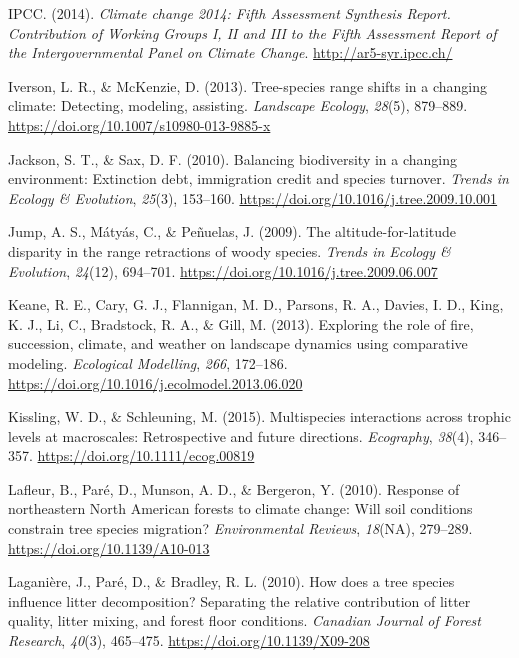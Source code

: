 \documentclass[
]{article}
\begin{document}
\leavevmode\hypertarget{ref-ipcc_climate_2014}{}%
IPCC. (2014). \emph{Climate change 2014: Fifth Assessment Synthesis
Report. Contribution of Working Groups I, II and III to the Fifth
Assessment Report of the Intergovernmental Panel on Climate Change}.
\url{http://ar5-syr.ipcc.ch/}

\leavevmode\hypertarget{ref-iverson_tree-species_2013}{}%
Iverson, L. R., \& McKenzie, D. (2013). Tree-species range shifts in a
changing climate: Detecting, modeling, assisting. \emph{Landscape
Ecology}, \emph{28}(5), 879--889.
\url{https://doi.org/10.1007/s10980-013-9885-x}

\leavevmode\hypertarget{ref-jackson_balancing_2010}{}%
Jackson, S. T., \& Sax, D. F. (2010). Balancing biodiversity in a
changing environment: Extinction debt, immigration credit and species
turnover. \emph{Trends in Ecology \& Evolution}, \emph{25}(3), 153--160.
\url{https://doi.org/10.1016/j.tree.2009.10.001}

\leavevmode\hypertarget{ref-jump_altitude-for-latitude_2009}{}%
Jump, A. S., Mátyás, C., \& Peñuelas, J. (2009). The
altitude-for-latitude disparity in the range retractions of woody
species. \emph{Trends in Ecology \& Evolution}, \emph{24}(12), 694--701.
\url{https://doi.org/10.1016/j.tree.2009.06.007}

\leavevmode\hypertarget{ref-keane_exploring_2013}{}%
Keane, R. E., Cary, G. J., Flannigan, M. D., Parsons, R. A., Davies, I.
D., King, K. J., Li, C., Bradstock, R. A., \& Gill, M. (2013). Exploring
the role of fire, succession, climate, and weather on landscape dynamics
using comparative modeling. \emph{Ecological Modelling}, \emph{266},
172--186. \url{https://doi.org/10.1016/j.ecolmodel.2013.06.020}

\leavevmode\hypertarget{ref-kissling_multispecies_2015}{}%
Kissling, W. D., \& Schleuning, M. (2015). Multispecies interactions
across trophic levels at macroscales: Retrospective and future
directions. \emph{Ecography}, \emph{38}(4), 346--357.
\url{https://doi.org/10.1111/ecog.00819}

\leavevmode\hypertarget{ref-lafleur_response_2010}{}%
Lafleur, B., Paré, D., Munson, A. D., \& Bergeron, Y. (2010). Response
of northeastern North American forests to climate change: Will soil
conditions constrain tree species migration? \emph{Environmental
Reviews}, \emph{18}(NA), 279--289. \url{https://doi.org/10.1139/A10-013}

\leavevmode\hypertarget{ref-laganiere_how_2010}{}%
Laganière, J., Paré, D., \& Bradley, R. L. (2010). How does a tree
species influence litter decomposition? Separating the relative
contribution of litter quality, litter mixing, and forest floor
conditions. \emph{Canadian Journal of Forest Research}, \emph{40}(3),
465--475. \url{https://doi.org/10.1139/X09-208}
\end{document}
